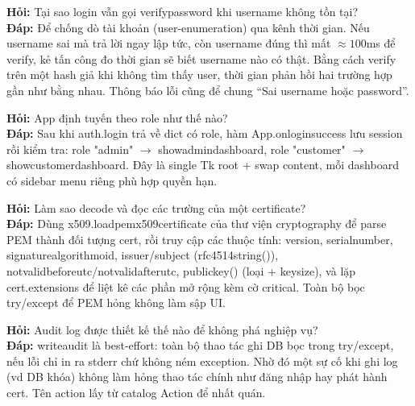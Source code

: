 \documentclass[12pt,a4paper]{article}
\newcommand{\code}[1]{{\ttfamily\small\def\_{\textunderscore\discretionary{}{}{}}#1}}
\begin{document}
\begin{qabox}
\textbf{Hỏi:} Tại sao \code{login} vẫn gọi \code{verify\_password} khi username
không tồn tại?\\[2pt]
\textbf{Đáp:} Để chống dò tài khoản (user-enumeration) qua kênh thời gian. Nếu
username sai mà trả lời ngay lập tức, còn username đúng thì mất $\approx 100$ms để
verify, kẻ tấn công đo thời gian sẽ biết username nào có thật. Bằng cách verify
trên một hash giả khi không tìm thấy user, thời gian phản hồi hai trường hợp gần
như bằng nhau. Thông báo lỗi cũng để chung ``Sai username hoặc password''.
\end{qabox}

\begin{qabox}
\textbf{Hỏi:} App định tuyến theo role như thế nào?\\[2pt]
\textbf{Đáp:} Sau khi \code{auth.login} trả về dict có \code{role}, hàm
\code{App.on\_login\_success} lưu \code{session} rồi kiểm tra: role
\code{"admin"} $\to$ \code{show\_admin\_dashboard}, role \code{"customer"} $\to$
\code{show\_customer\_dashboard}. Đây là single Tk root + swap content, mỗi
dashboard có sidebar menu riêng phù hợp quyền hạn.
\end{qabox}

\begin{qabox}
\textbf{Hỏi:} Làm sao decode và đọc các trường của một certificate?\\[2pt]
\textbf{Đáp:} Dùng \code{x509.load\_pem\_x509\_certificate} của thư viện
\code{cryptography} để parse PEM thành đối tượng cert, rồi truy cập các thuộc tính:
\code{version}, \code{serial\_number}, \code{signature\_algorithm\_oid},
\code{issuer}/\code{subject} (\code{rfc4514\_string()}),
\code{not\_valid\_before\_utc}/\code{not\_valid\_after\_utc}, \code{public\_key()}
(loại + \code{key\_size}), và lặp \code{cert.extensions} để liệt kê các phần mở
rộng kèm cờ \code{critical}. Toàn bộ bọc \code{try/except} để PEM hỏng không làm
sập UI.
\end{qabox}

\begin{qabox}
\textbf{Hỏi:} Audit log được thiết kế thế nào để không phá nghiệp vụ?\\[2pt]
\textbf{Đáp:} \code{write\_audit} là best-effort: toàn bộ thao tác ghi DB bọc
trong \code{try/except}, nếu lỗi chỉ in ra stderr chứ không ném exception. Nhờ đó
một sự cố khi ghi log (vd DB khóa) không làm hỏng thao tác chính như đăng nhập hay
phát hành cert. Tên action lấy từ catalog \code{Action} để nhất quán.
\end{qabox}
\end{document}
